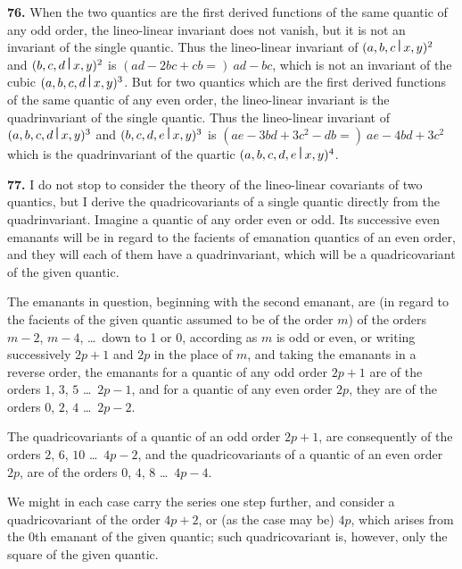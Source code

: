 \documentclass[11pt,a4paper]{book}
\begin{document}
\begin{center}
\medskip
\noindent\textbf{76.} When the two quantics are the first derived functions of the same quantic of any odd order, the lineo-linear invariant does not vanish, but it is not an invariant of the single quantic. Thus the lineo-linear invariant of $(a,b,c\,\raisebox{0.5ex}{\textbf{\textbar}}\,x,y)^2$ and $(b,c,d\,\raisebox{0.5ex}{\textbf{\textbar}}\,x,y)^2$ is $(ad-2bc+cb=)\ ad-bc$, which is not an invariant of the cubic $(a,b,c,d\,\raisebox{0.5ex}{\textbf{\textbar}}\,x,y)^3$. But for two quantics which are the first derived functions of the same quantic of any even order, the lineo-linear invariant is the quadrinvariant of the single quantic. Thus the lineo-linear invariant of $(a,b,c,d\,\raisebox{0.5ex}{\textbf{\textbar}}\,x,y)^3$ and $(b,c,d,e\,\raisebox{0.5ex}{\textbf{\textbar}}\,x,y)^3$ is $(ae-3bd+3c^2-db=)\ ae-4bd+3c^2$ which is the quadrinvariant of the quartic $(a,b,c,d,e\,\raisebox{0.5ex}{\textbf{\textbar}}\,x,y)^4$.

\newpage

\medskip
\noindent\textbf{77.} I do not stop to consider the theory of the lineo-linear covariants of two quantics, but I derive the quadricovariants of a single quantic directly from the quadrinvariant. Imagine a quantic of any order even or odd. Its successive even emanants will be in regard to the facients of emanation quantics of an even order, and they will each of them have a quadrinvariant, which will be a quadricovariant of the given quantic.

The emanants in question, beginning with the second emanant, are (in regard to the facients of the given quantic assumed to be of the order $m$) of the orders $m-2$, $m-4$, \ldots\ down to 1 or 0, according as $m$ is odd or even, or writing successively $2p+1$ and $2p$ in the place of $m$, and taking the emanants in a reverse order, the emanants for a quantic of any odd order $2p+1$ are of the orders $1$, $3$, $5$ \ldots\ $2p-1$, and for a quantic of any even order $2p$, they are of the orders $0$, $2$, $4$ \ldots\ $2p-2$.

The quadricovariants of a quantic of an odd order $2p+1$, are consequently of the orders $2$, $6$, $10$ \ldots\ $4p-2$, and the quadricovariants of a quantic of an even order $2p$, are of the orders $0$, $4$, $8$ \ldots\ $4p-4$.

We might in each case carry the series one step further, and consider a quadricovariant of the order $4p+2$, or (as the case may be) $4p$, which arises from the $0$th emanant of the given quantic; such quadricovariant is, however, only the square of the given quantic.


\end{center}
\end{document}
